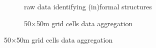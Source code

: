 \documentclass[12pt]{article}
\begin{document}

\begin{figure}[t!]
        \centering
        \caption[ Building-Based Land Use Data ]
        {\small Building-Based Land Use Data } 
        \vspace{2mm}
        \begin{subfigure}[b]{0.48\textwidth}
            \centering
            \caption[Network2]%
            {{\small raw data identifying (in)formal structures}}    
        \end{subfigure}
        \hfill\quad
        \begin{subfigure}[b]{0.48\textwidth}  
            \centering 
            \caption[]%
            {{\small 50$\times$50m grid cells data aggregation}}    
        \end{subfigure}
        \label{fig:bblumaps}
    \end{figure} 

\end{document}
